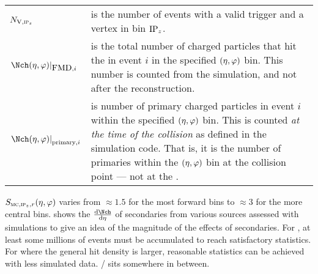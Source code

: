 \begin{tabular}[T]{p{.18\linewidth}p{.78\linewidth}}
  $\NV[,\subIPz]$ & is the number of events with a valid trigger
                    and a vertex in bin $\IPz$.\\ 
  $\dndetadphi[\FMD{},i]$ & is the total number of charged
                            particles that hit the \FMD{} in event $i$
                            in the specified $\etaphi$ bin.  This
                            number is counted from the simulation, and
                            not  after the
                            reconstruction\footnotemark.\\  
  $\dndetadphi[\text{primary},i]$ & is number of primary charged
                                    particles in event $i$ within the
                                    specified $\etaphi$ bin.  This is
                                    counted \emph{at the time of the
                                    collision} as defined in the
                                    simulation code.  That is, it is
                                    the number of primaries within the
                                    $\etaphi$ bin at the collision
                                    point --- not at the \FMD{}. 
\end{tabular}
\iffalse
\begin{description}
\item[] $\NV[,\subIPz]$ is the number of events with a valid trigger
  and a vertex in bin $\IPz$.
\item[] $\dndetadphi[\FMD{},i]$ is the total number of charged
  particles that hit the \FMD{} in event $i$ in the specified
  $\etaphi$ bin.  This number is counted from the simulation, and not
  after the reconstruction\footnote{Technically, we are counting
    `track references' within the $\etaphi$ bin for a given
    sub-detector.}.
\item[] $\dndetadphi[\text{primary},i]$ is number of primary charged
  particles in event $i$ within the specified $\etaphi$ bin.  This is
  counted \emph{at the time of the collision} as defined in the
  simulation code.  That is, it is the number of primaries within the
  $\etaphi$ bin at the collision point --- not at the \FMD{}.
\end{description}
\fi

$\SecMap$ varies from $\approx 1.5$ for the most forward bins to
$\approx 3$ for the more central bins. 
shows the $\dndeta$ of secondaries from various sources assessed with
simulations to give an idea of the magnitude of the effects of
secondaries. For \ppCol{}, at least some millions of events must be
accumulated to reach satisfactory statistics.  For \PbPbCol{} where
the general hit density is larger, reasonable statistics can be
achieved with less simulated data. \pPbCol{}/\PbpCol{} sits somewhere
in between.

